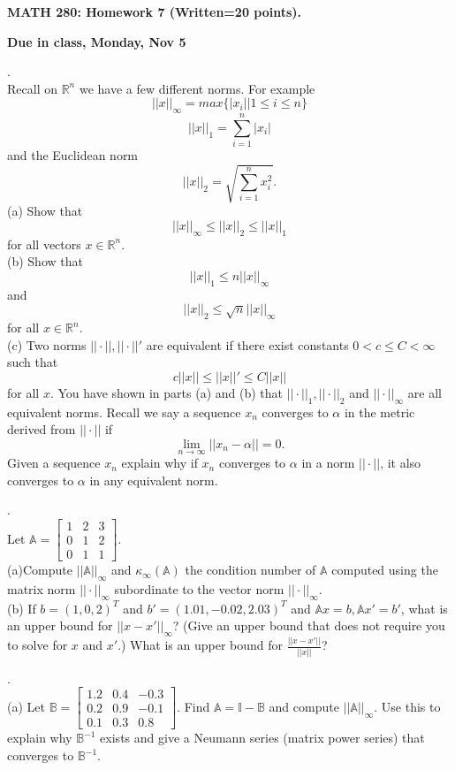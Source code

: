 \documentclass[12 pt]{article}
\begin{document}
\centerline{\bf MATH 280: Homework 7 (Written=20 points). }
\centerline{\bf Due in class, Monday, Nov 5}

\bigskip

. \\ Recall on $\mathbb{R}^n$ we have a few different norms. For example
$$
||x||_{\infty}=max\{ |x_i| | 1 \leq i \leq n \}
$$
$$
||x||_{1}=\sum_{i=1}^n |x_i| 
$$
and the Euclidean norm 
$$
||x||_{2}=\sqrt{\sum_{i=1}^n x_i^2}.
$$
(a) Show that $$||x||_{\infty} \leq ||x||_2 \leq ||x||_1$$ for all vectors $x \in \mathbb{R}^n$. \\

\noindent
(b) Show that $$||x||_1 \leq n ||x||_{\infty}$$ and $$||x||_2 \leq \sqrt{n} ||x||_{\infty}$$ for all $x \in \mathbb{R}^n$. \\

\noindent
(c) Two norms $||\cdot||, ||\cdot||'$ are equivalent if there exist constants $0 < c \leq C < \infty$ such that 
$$c||x|| \leq ||x||' \leq C||x||$$ for all $x$. You have shown in parts (a) and (b) that $||\cdot||_1, ||\cdot||_2$ and $||\cdot||_{\infty}$ 
are all equivalent norms. Recall we say a sequence $x_n$ converges to $\alpha$ in the metric derived from $|| \cdot ||$ if 
$$ \lim_{n \to \infty} ||x_n - \alpha|| = 0.$$ 
Given a sequence $x_n$ explain why if $x_n$ converges to $\alpha$ in a norm $|| \cdot ||$, it also converges to $\alpha$ 
in any equivalent norm.

\medskip

. \\ 
Let $\mathbb{A} = \begin{bmatrix} 1 & 2 & 3 \\ 0 & 1 & 2 \\ 0 & 1 & 1 \end{bmatrix}$. \\
(a)Compute $||\mathbb{A}||_{\infty}$ and $\kappa_{\infty}(\mathbb{A})$ the condition number of $\mathbb{A}$ computed 
using the matrix norm $||\cdot ||_{\infty}$ subordinate to the vector norm $|| \cdot ||_{\infty}$. \\

\noindent
(b) If $b=(1,0,2)^T$ and $b'=(1.01,-0.02, 2.03)^T$ and $\mathbb{A}x=b, \mathbb{A}x'=b'$, 
what is an upper bound for $||x-x'||_{\infty}$? (Give an upper bound that does not require you to solve for $x$ and $x'$.) What is an upper bound for $\frac{||x-x'||}{||x||}$?

\medskip

. \\
(a) Let $\mathbb{B}= \begin{bmatrix} 1.2 & 0.4 & -0.3 \\ 0.2 & 0.9 & -0.1 \\ 0.1 & 0.3 & 0.8 \end{bmatrix}$.
Find $\mathbb{A}=\mathbb{I} - \mathbb{B}$ and compute $||\mathbb{A}||_{\infty}$. 
Use this to explain why $\mathbb{B}^{-1}$ exists and give a Neumann series (matrix power series) that converges to $\mathbb{B}^{-1}$. \\
\end{document}
